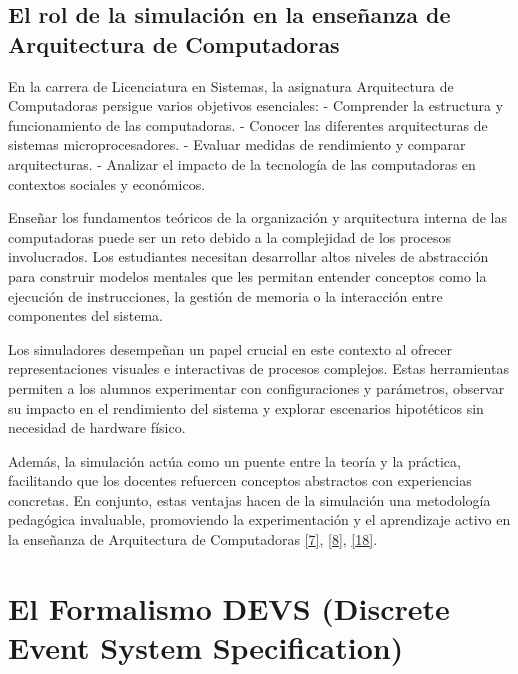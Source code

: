 \documentclass[12pt,oneside]{templates/unerthesis}
\begin{document}
\hypertarget{el-rol-de-la-simulaciuxf3n-en-la-enseuxf1anza-de-arquitectura-de-computadoras}{%
\subsection{El rol de la simulación en la enseñanza de Arquitectura de Computadoras}\label{el-rol-de-la-simulaciuxf3n-en-la-enseuxf1anza-de-arquitectura-de-computadoras}}

En la carrera de Licenciatura en Sistemas, la asignatura Arquitectura de Computadoras persigue varios objetivos esenciales:
- Comprender la estructura y funcionamiento de las computadoras.
- Conocer las diferentes arquitecturas de sistemas microprocesadores.
- Evaluar medidas de rendimiento y comparar arquitecturas.
- Analizar el impacto de la tecnología de las computadoras en contextos sociales y económicos.

Enseñar los fundamentos teóricos de la organización y arquitectura interna de las computadoras puede ser un reto debido a la complejidad de los procesos involucrados. Los estudiantes necesitan desarrollar altos niveles de abstracción para construir modelos mentales que les permitan entender conceptos como la ejecución de instrucciones, la gestión de memoria o la interacción entre componentes del sistema.

Los simuladores desempeñan un papel crucial en este contexto al ofrecer representaciones visuales e interactivas de procesos complejos. Estas herramientas permiten a los alumnos experimentar con configuraciones y parámetros, observar su impacto en el rendimiento del sistema y explorar escenarios hipotéticos sin necesidad de hardware físico.

Además, la simulación actúa como un puente entre la teoría y la práctica, facilitando que los docentes refuercen conceptos abstractos con experiencias concretas. En conjunto, estas ventajas hacen de la simulación una metodología pedagógica invaluable, promoviendo la experimentación y el aprendizaje activo en la enseñanza de Arquitectura de Computadoras \protect\hyperlink{ref-garcia-garcia_pbbcache_2020}{{[}7{]}}, \protect\hyperlink{ref-nova_tool_2013}{{[}8{]}}, \protect\hyperlink{ref-skrien_cpu_2001}{{[}18{]}}.

\hypertarget{el-formalismo-devs-discrete-event-system-specification}{%
\section{El Formalismo DEVS (Discrete Event System Specification)}\label{el-formalismo-devs-discrete-event-system-specification}}
\end{document}
